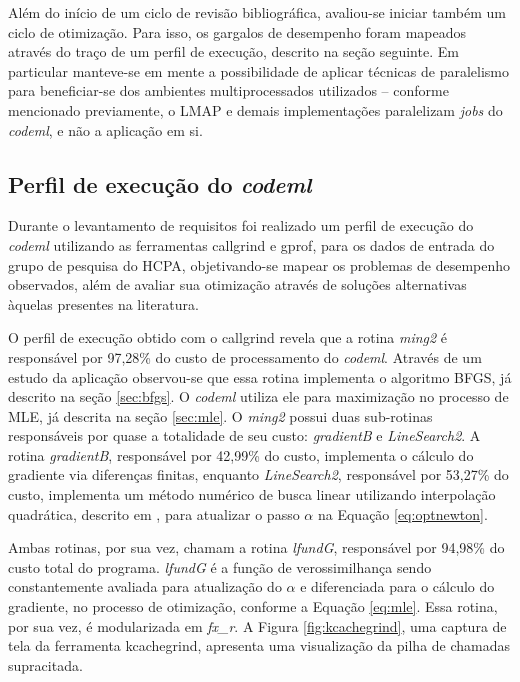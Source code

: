 \documentclass[cic,tc]{iiufrgs}
\begin{document}
Além do início de um ciclo de revisão bibliográfica, avaliou-se iniciar também
um ciclo de otimização. Para isso, os gargalos de desempenho foram mapeados
através do traço de um perfil de execução, descrito na seção seguinte. Em
particular manteve-se em mente a possibilidade de aplicar técnicas de
paralelismo para beneficiar-se dos ambientes multiprocessados utilizados --
conforme mencionado previamente, o LMAP e demais implementações paralelizam
\textit{jobs} do \textit{codeml}, e não a aplicação em si. 

\subsection{Perfil de execução do \textit{codeml}}
\label{sec:codemlpar}

Durante o levantamento de requisitos foi realizado um perfil de execução do
\textit{codeml} utilizando as ferramentas callgrind e gprof, para os dados de
entrada do grupo de pesquisa do HCPA, objetivando-se mapear os problemas de
desempenho observados, além de avaliar sua otimização através de soluções
alternativas àquelas presentes na literatura.

O perfil de execução obtido com o callgrind revela que a rotina \textit{ming2}
é responsável por 97,28\% do custo de processamento do \textit{codeml}. Através de um
estudo da aplicação observou-se que essa rotina implementa o algoritmo BFGS,
já descrito na seção \ref{sec:bfgs}. O \textit{codeml} utiliza ele para maximização no
processo de MLE, já descrita na seção \ref{sec:mle}. O \textit{ming2} possui duas
sub-rotinas responsáveis por quase a totalidade de seu custo:
\textit{gradientB} e \textit{LineSearch2}. A rotina \textit{gradientB},
responsável por 42,99\% do custo, implementa o cálculo do gradiente via
diferenças finitas, enquanto \textit{LineSearch2}, responsável por 53,27\% do
custo, implementa um método numérico de busca linear utilizando interpolação
quadrática, descrito em \cite{wolfe1978numerical}, para atualizar o passo
$\alpha$ na Equação \ref{eq:optnewton}.

Ambas rotinas, por sua vez, chamam a rotina \textit{lfundG}, responsável por
94,98\% do custo total do programa. \textit{lfundG} é a função de
verossimilhança sendo constantemente avaliada para atualização do $\alpha$ e
diferenciada para o cálculo do gradiente, no processo de otimização, conforme a
Equação \ref{eq:mle}. Essa rotina, por sua vez, é modularizada em
\textit{fx\_r}. A Figura \ref{fig:kcachegrind}, uma captura de tela da
ferramenta kcachegrind, apresenta uma visualização da pilha de chamadas
supracitada.
\end{document}
